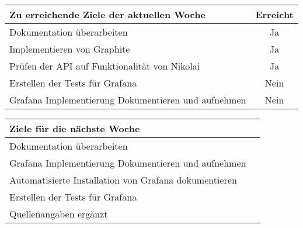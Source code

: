 \begin{tabularx}{\textwidth}{Xc}
    \arrayrulecolor{OliveGreen}
    \toprule
    {\bfseries Zu erreichende Ziele der aktuellen Woche} & {\bfseries Erreicht} \\
    \midrule[2pt]
    Dokumentation überarbeiten                              &Ja              \\
    \rowcolor{OliveGreen!15}
    Implementieren von Graphite                             &Ja              \\
    \rowcolor{White}
    Prüfen der API auf Funktionalität von Nikolai           &Ja              \\
    \rowcolor{OliveGreen!15}
    Erstellen der Tests für Grafana                         &Nein            \\
    \rowcolor{White}
    Grafana Implementierung Dokumentieren und aufnehmen     &Nein            \\
    \bottomrule[2pt]
\end{tabularx}
%
\vspace{1cm}
%
\begin{tabularx}{\textwidth}{Xc}
    \arrayrulecolor{OliveGreen}
    \toprule
    {\bfseries Ziele für die nächste Woche}        &                         \\
    \midrule[2pt]
    Dokumentation überarbeiten                     &                         \\
    \rowcolor{OliveGreen!15}
    Grafana Implementierung Dokumentieren und aufnehmen   &                  \\
    \rowcolor{White}
    Automatisierte Installation von Grafana dokumentieren        &           \\
    \rowcolor{OliveGreen!15}
    Erstellen der Tests für Grafana                       &                  \\
    \rowcolor{White}
    Quellenangaben ergänzt                                &                  \\
\end{tabularx}
